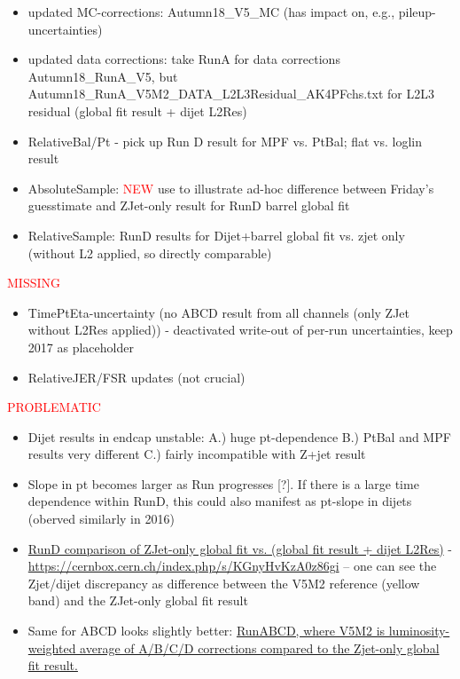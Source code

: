\documentclass[landscape,10pt]{beamer} %
\begin{document}
\begin{itemize}
\item updated MC-corrections: Autumn18\_V5\_MC (has impact on, e.g., pileup-uncertainties)
\item updated data corrections: take RunA for data corrections Autumn18\_RunA\_V5, but Autumn18\_RunA\_V5M2\_DATA\_L2L3Residual\_AK4PFchs.txt for L2L3 residual (global fit result + dijet L2Res)
\item RelativeBal/Pt - pick up Run D result for MPF vs. PtBal; flat vs. loglin result
\item AbsoluteSample: \textcolor{red}{NEW} use to illustrate ad-hoc difference between Friday's guesstimate and ZJet-only result for RunD barrel global fit
\item RelativeSample: RunD results for Dijet+barrel global fit vs. zjet only (without L2 applied, so directly comparable)
\end{itemize}
\textcolor{red}{MISSING}
\begin{itemize}
\item TimePtEta-uncertainty (no ABCD result from all channels (only ZJet without L2Res applied)) - deactivated write-out of per-run uncertainties, keep 2017 as placeholder
\item RelativeJER/FSR updates (not crucial)
\end{itemize}
\newpage
\textcolor{red}{PROBLEMATIC}
\begin{itemize}
  \item Dijet results in endcap unstable: A.) huge pt-dependence B.) PtBal and MPF results very different C.) fairly incompatible with Z+jet result
  \item Slope in pt becomes larger as Run progresses [?]. If there is a large time dependence within RunD, this could also manifest as pt-slope in dijets (oberved similarly in 2016)
  \item \textcolor{blue}{\href{https://cernbox.cern.ch/index.php/s/KGnyHvKzA0z86gi}{RunD comparison of ZJet-only global fit vs. (global fit result + dijet L2Res)}} - \href{https://cernbox.cern.ch/index.php/s/KGnyHvKzA0z86gi}{https://cernbox.cern.ch/index.php/s/KGnyHvKzA0z86gi} -- one can see the Zjet/dijet discrepancy as difference between the V5M2 reference (yellow band) and the ZJet-only global fit result
  \item Same for ABCD looks slightly  better: \textcolor{blue}{\href{https://cernbox.cern.ch/index.php/s/3w1LhvnxmcBmTCY}{RunABCD, where V5M2 is luminosity-weighted average of A/B/C/D corrections compared to the Zjet-only global fit result. }}
\end{itemize}
\end{document}
